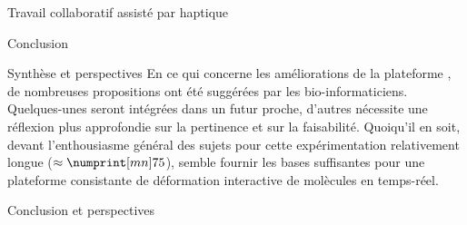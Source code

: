 \documentclass[myfrancais,ngerman,english,french]{mythesis}
\begin{document}
\begin{mychapter}{Travail collaboratif assisté par haptique}
\begin{mysection}{Conclusion}
\begin{mysubsection}{Synthèse et perspectives}
				En ce qui concerne les améliorations de la plateforme \myShaddock, de nombreuses propositions ont été suggérées par les bio-informaticiens.
				Quelques-unes seront intégrées dans un futur proche, d'autres nécessite une réflexion plus approfondie sur la pertinence et sur la faisabilité.
				Quoiqu'il en soit, devant l'enthousiasme général des sujets pour cette expérimentation relativement longue ($\approx \mynum[mn]{75}$), \myShaddock semble fournir les bases suffisantes pour une plateforme consistante de déformation interactive de molècules en temps-réel.
			\end{mysubsection}
		\end{mysection}
	\end{mychapter}
	\begin{mychapter+}{Conclusion et perspectives}
	\end{mychapter+}
	\mybiblio%
	\myglossary
	\myappendix
\end{document}
